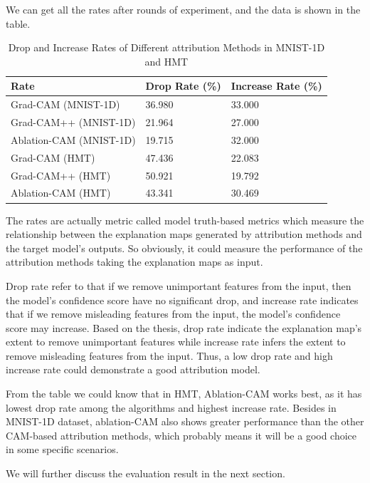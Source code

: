 \documentclass[conference]{IEEEtran}
\begin{document}
We can get all the rates after rounds of experiment, and the data is shown in the table.

\begin{table}[h]
\caption{Drop and Increase Rates of Different attribution Methods in MNIST-1D and HMT}
\begin{tabular}{|l|l|l|}
\hline
Rate                    & Drop Rate (\%) & Increase Rate (\%) \\ \hline
Grad-CAM (MNIST-1D)     & 36.980         & 33.000             \\ \hline
Grad-CAM++ (MNIST-1D)   & 21.964         & 27.000             \\ \hline
Ablation-CAM (MNIST-1D) & 19.715         & 32.000             \\ \hline
Grad-CAM (HMT)          & 47.436         & 22.083             \\ \hline
Grad-CAM++ (HMT)        & 50.921         & 19.792             \\ \hline
Ablation-CAM (HMT)      & 43.341         & 30.469             \\ \hline
\end{tabular}
\end{table}

The rates are actually metric called model truth-based metrics which measure the relationship between the explanation maps generated by attribution methods and the target model's outputs. So obviously, it could measure the performance of the attribution methods taking the explanation maps as input.\par
Drop rate refer to that if we remove unimportant features from the input, then the model's confidence score have no significant drop, and increase rate indicates that if we remove misleading features from the input, the model's confidence score may increase. Based on the thesis, drop rate indicate the explanation map's extent to remove unimportant features while increase rate infers the extent to remove misleading features from the input. Thus, a low drop rate and high increase rate could demonstrate a good attribution model.\par
From the table we could know that in HMT, Ablation-CAM works best, as it has lowest drop rate among the algorithms and highest increase rate. Besides in MNIST-1D dataset, ablation-CAM also shows greater performance than the other CAM-based attribution methods, which probably means it will be a good choice in some specific scenarios.\par
We will further discuss the evaluation result in the next section.
\end{document}
